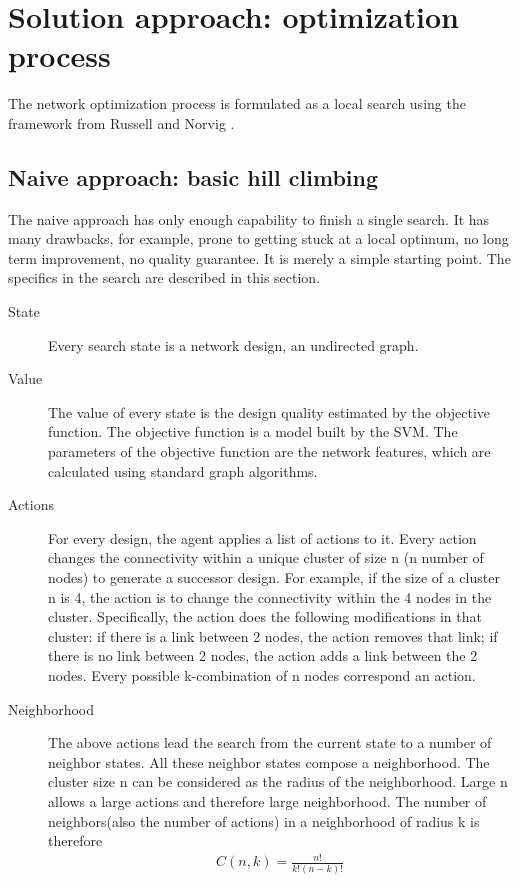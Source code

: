 \documentclass[12pt]{article}
\theoremstyle{definition}
\begin{document}
\section{Solution approach: optimization process}
The network optimization process is formulated as a local search using the framework from Russell and Norvig \cite{russell1995modern}.
\subsection{Naive approach: basic hill climbing}
The naive approach has only enough capability to finish a single search. It has many drawbacks, for example, prone to getting stuck at a local optimum, no long term improvement, no quality guarantee. It is merely a simple starting point. The specifics in the search are described in this section.
\begin{description}
\item[State]
Every search state is a network design, an undirected graph.
\item[Value]
The value of every state is the design quality estimated by the objective function. The objective function is a model built by the SVM. The parameters of the objective function are the network features, which are calculated using standard graph algorithms.
\item[Actions]
For every design, the agent applies a list of actions to it. Every action changes the connectivity within a unique cluster of size n (n number of nodes) to generate a successor design. For example, if the size of a cluster n is 4, the action is to change the connectivity within the 4 nodes in the cluster. Specifically, the action does the following modifications in that cluster: if there is a link between 2 nodes, the action removes that link; if there is no link between 2 nodes, the action adds a link between the 2 nodes. Every possible k-combination of n nodes correspond an action.
\item[Neighborhood]
The above actions lead the search from the current state to a number of neighbor states. All these neighbor states compose a neighborhood. The cluster size n can be considered as the radius of the neighborhood. Large n allows a large actions and therefore large neighborhood. The number of neighbors(also the number of actions) in a neighborhood of radius k is therefore
\begin{align*}
  C(n,k) = \frac{n!}{k!(n-k)!}
\end{align*}
\end{description}
\end{document}
